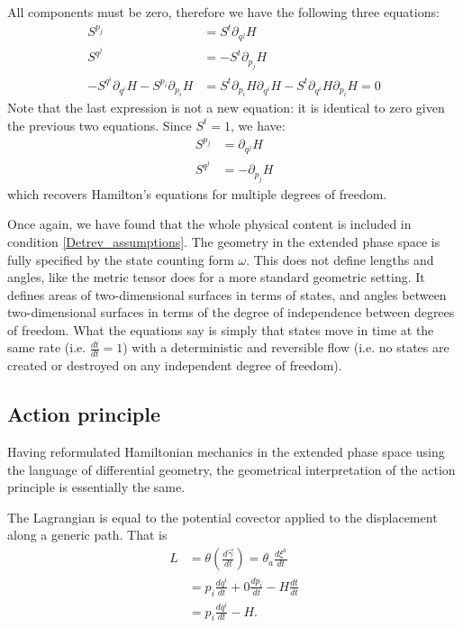 \documentclass[10pt,twocolumn, nofootinbib]{revtex4-2}
\begin{document}
All components must be zero, therefore we have the following three equations:
\begin{align*}
	S^{p_j} &= S^{t} \partial_{q^j} H \\
	S^{q^j} &= - S^{t}\partial_{p_j} H \\
	-S^{q^i} \partial_{q^i} H - S^{p_i} \partial_{p_i} H &= S^{t}\partial_{p_i} H \partial_{q^i} H - S^{t} \partial_{q^i} H \partial_{p_i} H = 0
\end{align*}
Note that the last expression is not a new equation: it is identical to zero given the previous two equations. Since $S^t = 1$, we have:
\begin{align*}
	S^{p_j} &= \partial_{q^j} H \\
	S^{q^j} &= - \partial_{p_j} H
\end{align*}
which recovers Hamilton's equations for multiple degrees of freedom.

Once again, we have found that the whole physical content is included in condition \ref{Detrev_assumptions}. The geometry in the extended phase space is fully specified by the state counting form $\omega$. This does not define lengths and angles, like the metric tensor does for a more standard geometric setting. It defines areas of two-dimensional surfaces in terms of states, and angles between two-dimensional surfaces in terms of the degree of independence between degrees of freedom. What the equations say is simply that states move in time at the same rate (i.e. $\frac{dt}{dt} = 1$) with a deterministic and reversible flow (i.e. no states are created or destroyed on any independent degree of freedom).

\subsection{Action principle}
Having reformulated Hamiltonian mechanics in the extended phase space using the language of differential geometry, the geometrical interpretation of the action principle is essentially the same.

The Lagrangian is equal to the potential covector applied to the displacement along a generic path. That is
\begin{equation}
\begin{aligned}
L &= \theta\left(\frac{d\vec{\gamma}}{dt}\right) = \theta_a \frac{d\xi^a}{dt} \\
&= p_i \frac{dq^i}{dt} + 0 \frac{dp_i}{dt} - H \frac{dt}{dt} \\
&= p_i \frac{dq^i}{dt} - H.
\end{aligned}
\end{equation}
\end{document}
